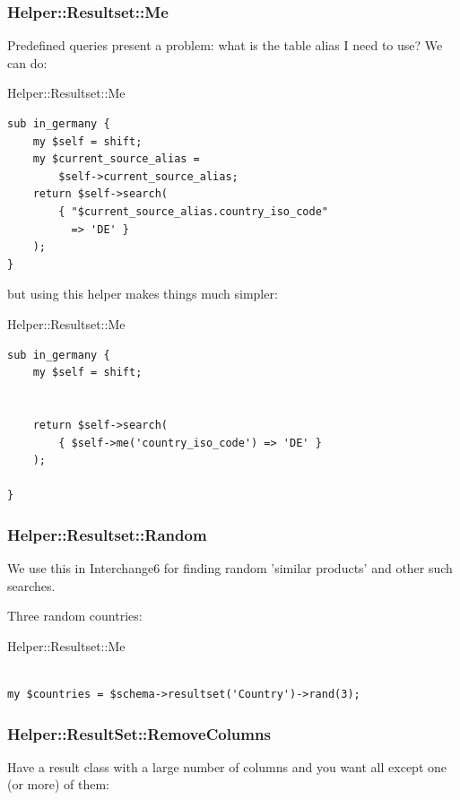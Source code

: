 \subsubsection{Helper::Resultset::Me}

Predefined queries present a problem: what is the table alias I need to use?
We can do:

\begin{frame}[fragile]{Helper::Resultset::Me}
\begin{lstlisting}
sub in_germany {
    my $self = shift;
    my $current_source_alias =
        $self->current_source_alias;
    return $self->search(
        { "$current_source_alias.country_iso_code"
          => 'DE' }
    );
}
\end{lstlisting}
\end{frame}

but using this helper makes things much simpler:

\begin{frame}[fragile]{Helper::Resultset::Me}
\begin{lstlisting}
sub in_germany {
    my $self = shift;


    return $self->search(
        { $self->me('country_iso_code') => 'DE' }
    );

}
\end{lstlisting}
\end{frame}

\subsubsection{Helper::Resultset::Random}

We use this in Interchange6 for finding random 'similar products' and other
such searches.

Three random countries:

\begin{frame}[fragile]{Helper::Resultset::Me}
\begin{lstlisting}

my $countries = $schema->resultset('Country')->rand(3);

\end{lstlisting}
\end{frame}

\subsubsection{Helper::ResultSet::RemoveColumns}
Have a result class with a large number of columns and you want all except
one (or more) of them:

